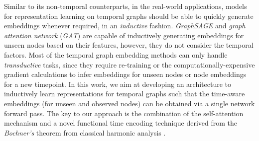 \documentclass{article} %
\begin{document}

Similar to its non-temporal counterparts, in the real-world applications, models for representation learning on temporal graphs should be able to quickly generate embeddings whenever required, in an \emph{inductive} fashion. \textsl{GraphSAGE} \citep{hamilton2017inductive} and \textsl{graph attention network} (\textsl{GAT}) \citep{velivckovic2017graph} are capable of inductively generating embeddings for unseen nodes based on their features, however, they do not consider the temporal factors. Most of the temporal graph embedding methods can only handle \textsl{transductive} tasks, since they require re-training or the computationally-expensive gradient calculations to infer embeddings for unseen nodes or node embeddings for a new timepoint. In this work, we aim at developing an architecture to inductively learn representations for temporal graphs such that the time-aware embeddings (for unseen and observed nodes) can be obtained via a single network forward pass. The key to our approach is the combination of the self-attention mechanism \citep{vaswani2017attention} and a novel functional time encoding technique derived from the \textsl{Bochner's} theorem from classical harmonic analysis \citep{loomis2013introduction}. 
\end{document}
